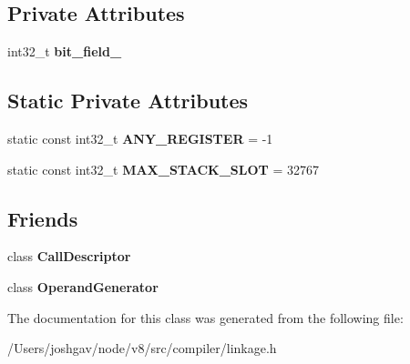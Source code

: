 \subsection*{Private Attributes}
\begin{DoxyCompactItemize}
\item 
int32\+\_\+t {\bfseries bit\+\_\+field\+\_\+}\hypertarget{classv8_1_1internal_1_1compiler_1_1_linkage_location_ac333f46bed01a542f76ca82464505d5c}{}\label{classv8_1_1internal_1_1compiler_1_1_linkage_location_ac333f46bed01a542f76ca82464505d5c}

\end{DoxyCompactItemize}
\subsection*{Static Private Attributes}
\begin{DoxyCompactItemize}
\item 
static const int32\+\_\+t {\bfseries A\+N\+Y\+\_\+\+R\+E\+G\+I\+S\+T\+ER} = -\/1\hypertarget{classv8_1_1internal_1_1compiler_1_1_linkage_location_ac509b62f4dbc433bd47e3b50de47d427}{}\label{classv8_1_1internal_1_1compiler_1_1_linkage_location_ac509b62f4dbc433bd47e3b50de47d427}

\item 
static const int32\+\_\+t {\bfseries M\+A\+X\+\_\+\+S\+T\+A\+C\+K\+\_\+\+S\+L\+OT} = 32767\hypertarget{classv8_1_1internal_1_1compiler_1_1_linkage_location_a9980cb6b52480e299450de5fe1bbf4eb}{}\label{classv8_1_1internal_1_1compiler_1_1_linkage_location_a9980cb6b52480e299450de5fe1bbf4eb}

\end{DoxyCompactItemize}
\subsection*{Friends}
\begin{DoxyCompactItemize}
\item 
class {\bfseries Call\+Descriptor}\hypertarget{classv8_1_1internal_1_1compiler_1_1_linkage_location_a3ab4612d87898ee9b829c817689e26e8}{}\label{classv8_1_1internal_1_1compiler_1_1_linkage_location_a3ab4612d87898ee9b829c817689e26e8}

\item 
class {\bfseries Operand\+Generator}\hypertarget{classv8_1_1internal_1_1compiler_1_1_linkage_location_a348308372de1bb413360ad7eff055f94}{}\label{classv8_1_1internal_1_1compiler_1_1_linkage_location_a348308372de1bb413360ad7eff055f94}

\end{DoxyCompactItemize}


The documentation for this class was generated from the following file\+:\begin{DoxyCompactItemize}
\item 
/\+Users/joshgav/node/v8/src/compiler/linkage.\+h\end{DoxyCompactItemize}
